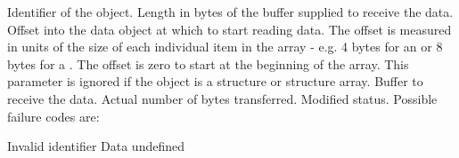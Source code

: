 \begin{manroutinedescription}
\begin{manparametertable}
 Identifier of the object.
  Length in bytes of the %
buffer supplied to receive
                            the data.
  Offset into the data %
object at which to start
                            reading data. The offset is measured in units of
                            the size of each individual item in the array -
                            e.g. 4 bytes for an {} or 8 bytes for a %
{}.
                            The offset is zero to start at the beginning of the
                            array. This parameter is ignored if the object
                            is a structure or structure array.
 Buffer to receive the data.
 Actual number of bytes %
transferred.
 Modified status. Possible %
failure codes are:
\end{manparametertable}
\begin{mantwocolumntable}
Invalid identifier
Data undefined
\end{mantwocolumntable}
\end{manroutinedescription}
